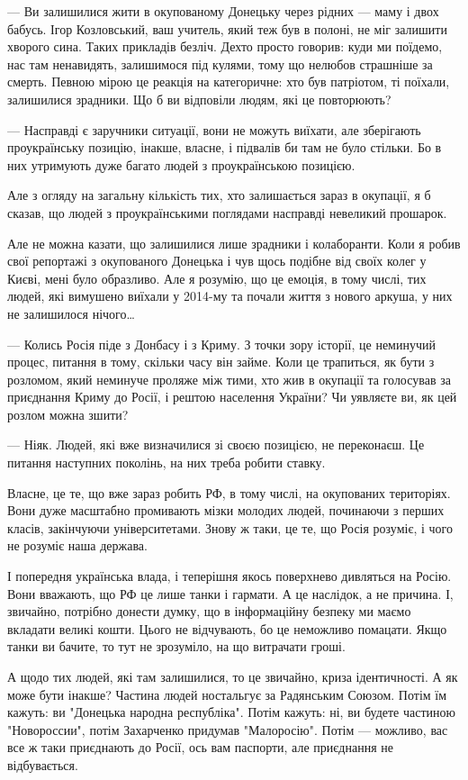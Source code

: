 — Ви залишилися жити в окупованому Донецьку через рідних — маму і двох бабусь.
Ігор Козловський, ваш учитель, який теж був в полоні, не міг залишити хворого
сина. Таких прикладів безліч. Дехто просто говорив: куди ми поїдемо, нас там
ненавидять, залишимося під кулями, тому що нелюбов страшніше за смерть. Певною
мірою це реакція на категоричне: хто був патріотом, ті поїхали, залишилися
зрадники. Що б ви відповіли людям, які це повторюють?

— Насправді є заручники ситуації, вони не можуть виїхати, але зберігають
проукраїнську позицію, інакше, власне, і підвалів би там не було стільки. Бо в
них утримують дуже багато людей з проукраїнською позицією.

Але з огляду на загальну кількість тих, хто залишається зараз в окупації, я б
сказав, що людей з проукраїнськими поглядами насправді невеликий прошарок.

Але не можна казати, що залишилися лише зрадники і колаборанти. Коли я робив
свої репортажі з окупованого Донецька і чув щось подібне від своїх колег у
Києві, мені було образливо. Але я розумію, що це емоція, в тому числі, тих
людей, які вимушено виїхали у 2014-му та почали життя з нового аркуша, у них не
залишилося нічого…

— Колись Росія піде з Донбасу і з Криму. З точки зору історії, це неминучий
процес, питання в тому, скільки часу він займе. Коли це трапиться, як бути з
розломом, який неминуче проляже між тими, хто жив в окупації та голосував за
приєднання Криму до Росії, і рештою населення України? Чи уявляєте ви, як цей
розлом можна зшити?

— Ніяк. Людей, які вже визначилися зі своєю позицією, не переконаєш. Це питання
наступних поколінь, на них треба робити ставку.

Власне, це те, що вже зараз робить РФ, в тому числі, на окупованих територіях.
Вони дуже масштабно промивають мізки молодих людей, починаючи з перших класів,
закінчуючи університетами. Знову ж таки, це те, що Росія розуміє, і чого не
розуміє наша держава.

І попередня українська влада, і теперішня якось поверхнево дивляться на Росію.
Вони вважають, що РФ це лише танки і гармати. А це наслідок, а не причина. І,
звичайно, потрібно донести думку, що в інформаційну безпеку ми маємо вкладати
великі кошти. Цього не відчувають, бо це неможливо помацати. Якщо танки ви
бачите, то тут не зрозуміло, на що витрачати гроші.

А щодо тих людей, які там залишилися, то це звичайно, криза ідентичності. А як
може бути інакше? Частина людей ностальгує за Радянським Союзом. Потім їм
кажуть: ви "Донецька народна республіка". Потім кажуть: ні, ви будете частиною
"Новороссии", потім Захарченко придумав "Малоросію". Потім — можливо, вас все ж
таки приєднають до Росії, ось вам паспорти, але приєднання не відбувається. 

